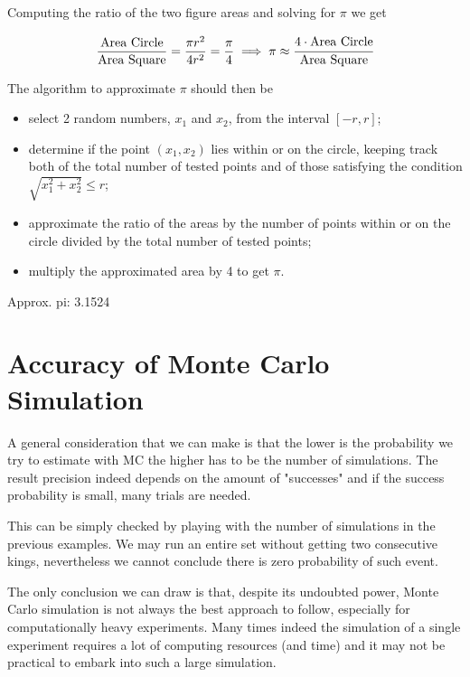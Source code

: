 Computing the ratio of the two figure areas and solving for $\pi$ we get

\begin{equation}
\frac{\text{Area Circle}}{\text{Area Square}} = \frac{\pi r^2}{4r^2} = \frac{\pi}{4} \implies \pi \approx \cfrac{4\cdot\text{Area Circle}}{\text{Area Square}}
\end{equation}

The algorithm to approximate $\pi$ should then be

\begin{itemize}
\item select 2 random numbers, $x_1$ and $x_2$, from the interval $[-r,r]$; 
\item determine if the point $(x_1, x_2)$ lies within or on the circle, keeping track both of the total number of tested points and of those satisfying the condition $\sqrt{x_1^2 + x_2^2}\leq r$; 
\item approximate the ratio of the areas by the number of points within or on the circle divided by the total number of tested points; 
\item multiply the approximated area by 4 to get $\pi$.
\end{itemize}

\begin{ioutput}
Approx. pi: 3.1524
\end{ioutput}

\section{Accuracy of Monte Carlo Simulation}
\label{sec:confidence_interval}

A general consideration that we can make is that the lower is the probability we try to estimate with MC the higher has to be the number of simulations. The result precision indeed depends on the amount of "successes" and if the success probability is small, many trials are needed. 

This can be simply checked by playing with the number of simulations in the previous examples. We may run an entire set without getting two consecutive kings, nevertheless we cannot conclude there is zero probability of such event.

The only conclusion we can draw is that, despite its undoubted power, Monte Carlo simulation is not always the best approach to follow, especially for computationally heavy experiments. Many times indeed the simulation of a single experiment requires a lot of computing resources (and time) and it may not be practical to embark into such a large simulation.

